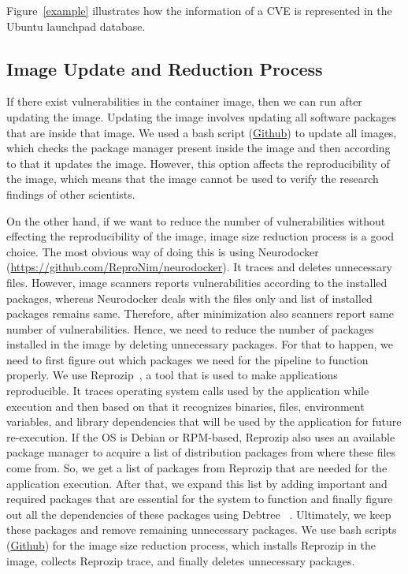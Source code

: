 \documentclass[a4paper,num-refs]{oup-contemporary}
\begin{document}
Figure~\ref{example} illustrates how the information of a CVE is represented
in the Ubuntu launchpad database.

\subsection{Image Update and Reduction Process}

If there exist vulnerabilities in the container image, then we can
run after updating the
image. Updating the image involves updating all software packages that are
inside that image. We used a bash script 
(\href{https://github.com/kaurbhupinder/Vulnerability-Analysis/blob/master/Scripts/update/update.sh}{Github}) 
to update all images, which checks the
package manager present inside the image and then according to that it
updates the image. However, this option affects the reproducibility
of the image, which means that the image cannot be used to verify the research
findings of other scientists.

On the other hand, if we want to reduce the number of vulnerabilities without effecting the reproducibility of the image,
image size reduction process is a good choice. The most obvious way of doing this is using 
Neurodocker (\href{https://github.com/ReproNim/neurodocker}{https://github.com/ReproNim/neurodocker}).
It traces and deletes unnecessary files.
However, image scanners reports vulnerabilities according to the installed
packages, whereas Neurodocker deals with the files only and list of installed packages remains same. Therefore, after
minimization also scanners report same number of vulnerabilities.
Hence, we need to reduce the number of packages
installed in the image by deleting unnecessary packages. For that to happen, we need to first figure
out which packages we need for the pipeline to function properly. We use
Reprozip~\cite{rampin2016reprozip}, a tool that
is used to make applications reproducible. It traces operating system calls used by the
application while execution and then based on that it recognizes binaries, files, environment variables,
and library dependencies that will be used by the application for future re-execution. If the OS is
Debian or RPM-based, Reprozip also
uses an available package manager to acquire a list of distribution packages from where these files come from.
So, we get a list of packages from Reprozip that are needed for the application execution. 
After that, we expand this list by adding important and required packages that are essential
for the system to function and finally figure out all the dependencies of these packages using Debtree
~\cite{debtree}.
Ultimately, we keep these packages and remove remaining unnecessary packages. We use bash scripts
(\href{https://github.com/kaurbhupinder/Vulnerability-Analysis/tree/master/Scripts/minification}{Github}) for
the image size reduction process, which installs Reprozip in the image, collects Reprozip trace, and
finally deletes unnecessary packages.
\end{document}
